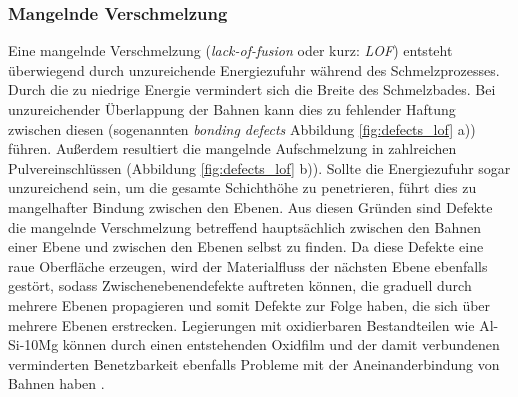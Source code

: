 		\subsubsection{Mangelnde Verschmelzung}
		Eine mangelnde Verschmelzung (\emph{lack-of-fusion} oder kurz: \emph{LOF}) entsteht
		überwiegend durch unzureichende Energiezufuhr während des Schmelzprozesses. Durch die zu
		niedrige Energie vermindert sich die Breite des Schmelzbades. Bei unzureichender
		Überlappung der Bahnen kann dies zu fehlender Haftung zwischen diesen (sogenannten
		\emph{bonding defects} Abbildung \ref{fig:defects_lof} a)) führen. Außerdem resultiert
		die mangelnde Aufschmelzung in zahlreichen Pulvereinschlüssen (Abbildung
		\ref{fig:defects_lof} b)). Sollte die Energiezufuhr sogar unzureichend sein, um die
		gesamte Schichthöhe zu penetrieren, führt dies zu mangelhafter Bindung zwischen den
		Ebenen. Aus diesen Gründen sind Defekte die mangelnde Verschmelzung betreffend
		hauptsächlich zwischen den Bahnen einer Ebene und zwischen den Ebenen selbst zu finden. Da
		diese Defekte eine raue Oberfläche erzeugen, wird der Materialfluss der nächsten Ebene
		ebenfalls gestört, sodass Zwischenebenendefekte auftreten können, die graduell durch
		mehrere Ebenen propagieren und somit Defekte zur Folge haben, die sich über mehrere Ebenen
		erstrecken. Legierungen mit oxidierbaren Bestandteilen wie Al-Si-10Mg können durch einen
		entstehenden Oxidfilm und der damit verbundenen verminderten Benetzbarkeit ebenfalls
		Probleme mit der Aneinanderbindung von Bahnen haben \cite{zhang2017defect}.


